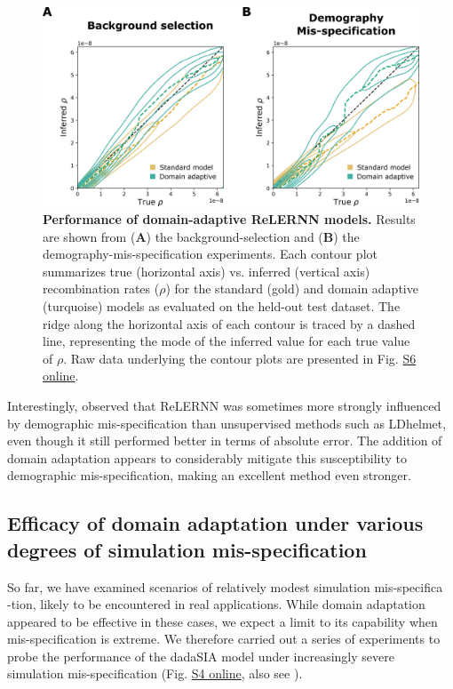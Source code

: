 \begin{figure}[h]
    \centering
    \includegraphics[width=\textwidth]{DA_figs/DA_F4.PNG}
    \caption[Performance of domain-adaptive ReLERNN models.]{\textbf{Performance of domain-adaptive ReLERNN models.} Results are shown from (\textbf{A}) the background-selection and (\textbf{B}) the demography-mis-specification experiments. Each contour plot summarizes true (horizontal axis) vs. inferred (vertical axis) recombination rates ($\rho$) for the standard (gold) and domain adaptive (turquoise) models as evaluated on the held-out test dataset. The ridge along the horizontal axis of each contour is traced by a dashed line, representing the mode of the inferred value for each true value of $\rho$. Raw data underlying the contour plots are presented in Fig. \href{https://journals.plos.org/plosgenetics/article?id=10.1371/journal.pgen.1011032\#sec018}{S6 online}.}
    \label{fig:DA-F4}
\end{figure}

Interestingly, \cite{adrion_predicting_2020} observed that ReLERNN was sometimes more strongly influenced by demographic mis-specification than unsupervised methods such as LDhelmet, even though it still performed better in terms of absolute error. The addition of domain adaptation appears to considerably mitigate this susceptibility to demographic mis-specification, making an excellent method even stronger.

\subsection{Efficacy of domain adaptation under various degrees of simulation mis-specification}
So far, we have examined scenarios of relatively modest simulation mis-specifica\\-tion, likely to be encountered in real applications. While domain adaptation appeared to be effective in these cases, we expect a limit to its capability when mis-specification is extreme. We therefore carried out a series of experiments to probe the performance of the \ac{dadaSIA} model under increasingly severe simulation mis-specification (Fig. \href{https://journals.plos.org/plosgenetics/article?id=10.1371/journal.pgen.1011032#sec018}{S4 online}, also see ).

